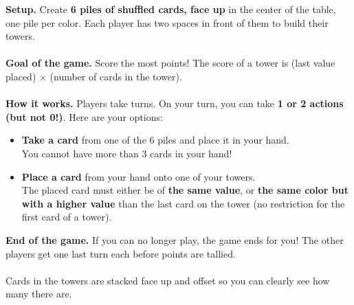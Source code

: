 \documentclass[a4paper]{memoir}
\begin{document}
{\footnotesize

\noindent
\textbf{ Setup.} Create \textbf{6 piles of shuffled cards, face up} in the center of the table, one pile per color.
Each player has two spaces in front of them to build their towers.
\\
\\
\noindent
\textbf{ Goal of the game.} Score the most points! The score of a tower is (last value placed) $\times$ (number of cards in the tower).
\\
\\
\noindent
\textbf{ How it works.} Players take turns. On your turn, you can take \textbf{1 or 2 actions (but not 0!)}. Here are your options:
\begin{itemize}
\item\textbf{Take a card} from one of the 6 piles and place it in your hand. 
\\
 You cannot have more than 3 cards in your hand!
\item\textbf{Place a card} from your hand onto one of your towers. 
\\
 The placed card must either be of \textbf{the same value}, or \textbf{the same color but with a higher value} than the last card on the tower (no restriction for the first card of a tower).
\end{itemize}
\noindent
\textbf{ End of the game.}
If you can no longer play, the game ends for you!
The other players get one last turn each before points are tallied.
\\
\\
\noindent
{} Cards in the towers are stacked face up and offset so you can clearly see how many there are.
}
\end{document}
